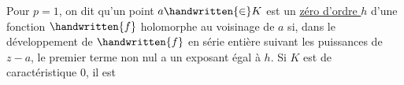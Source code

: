 Pour $p=1$, on dit qu'un point $a\handwritten{\in}K$ est un \uline{zéro d'ordre $h$} d'une fonction $\handwritten{f}$ holomorphe au voisinage de $a$ si, dans le développement de $\handwritten{f}$ en série entière suivant les puissances de $z-a$, le premier terme non nul a un exposant égal à $h$. Si $K$ est de caractéristique $0$, il est
